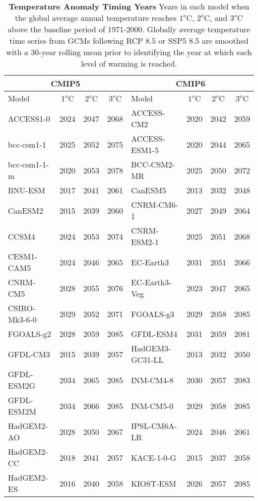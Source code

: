 \documentclass[]{scrartcl}
\begin{document}
\begin{table}[ht!]
	\caption{\textbf{Temperature Anomaly Timing Years} Years in each model when the global average annual temperature reaches  $1^o$C, $2^o$C, and $3^o$C above the baseline period of 1971-2000. Globally average temperature time series from GCMs following RCP 8.5 or SSP5 8.5 are smoothed with a 30-year rolling mean prior to identifying the year at which each level of warming is reached.} \label{table:cmip_anom_timing}
	\begin{center}
		\begin{tabular}{|l|c|c|c|l|c|c|c|}
			\hline
			\multicolumn{4}{|c|}{\textbf{CMIP5}} & \multicolumn{4}{|c|}{\textbf{CMIP6}} \\
			\hline
			Model  & $1^o$C & $2^o$C & $3^o$C & Model  & $1^o$C & $2^o$C & $3^o$C \\
			\hline
			ACCESS1-0 & 2024 & 2047 & 2068 & ACCESS-CM2 & 2020 & 2042 & 2059 \\ 
			bcc-csm1-1 & 2025 & 2052 & 2075 & ACCESS-ESM1-5 & 2020 & 2044 & 2065 \\ 
			bcc-csm1-1-m & 2020 & 2053 & 2078 & BCC-CSM2-MR & 2025 & 2050 & 2072 \\ 
			BNU-ESM & 2017 & 2041 & 2061 & CanESM5 & 2013 & 2032 & 2048 \\ 
			CanESM2 & 2015 & 2039 & 2060 & CNRM-CM6-1 & 2027 & 2049 & 2064 \\ 
			CCSM4 & 2024 & 2053 & 2074 & CNRM-ESM2-1 & 2025 & 2051 & 2068 \\ 
			CESM1-CAM5 & 2024 & 2046 & 2065 & EC-Earth3 & 2031 & 2051 & 2066 \\ 
			CNRM-CM5 & 2028 & 2055 & 2076 & EC-Earth3-Veg & 2023 & 2047 & 2065 \\ 
			CSIRO-Mk3-6-0 & 2029 & 2052 & 2071 & FGOALS-g3 & 2029 & 2058 & 2085 \\ 
			FGOALS-g2 & 2028 & 2059 & 2085 & GFDL-ESM4 & 2031 & 2059 & 2081 \\ 
			GFDL-CM3 & 2015 & 2039 & 2057 & HadGEM3-GC31-LL & 2013 & 2032 & 2050 \\ 
			GFDL-ESM2G & 2034 & 2065 & 2085 & INM-CM4-8 & 2030 & 2057 & 2083 \\ 
			GFDL-ESM2M & 2034 & 2066 & 2085 & INM-CM5-0 & 2029 & 2058 & 2085 \\ 
			HadGEM2-AO & 2028 & 2050 & 2067 & IPSL-CM6A-LR & 2024 & 2046 & 2061 \\ 
			HadGEM2-CC & 2018 & 2041 & 2057 & KACE-1-0-G & 2015 & 2037 & 2058 \\ 
			HadGEM2-ES & 2016 & 2040 & 2058 & KIOST-ESM & 2026 & 2057 & 2085 \\ 

\end{tabular}
\end{center}
\end{table}
\end{document}
